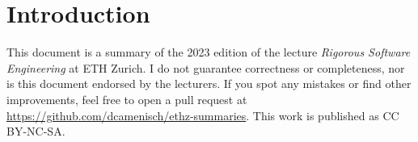 \section{Introduction}

This document is a summary of the 2023 edition of the lecture \textit{Rigorous Software Engineering} at ETH Zurich. I do not guarantee correctness or completeness, nor is this document endorsed by the lecturers. If you spot any mistakes or find other improvements, feel free to open a pull request at \url{https://github.com/dcamenisch/ethz-summaries}. This work is published as CC BY-NC-SA.
\begin{center}
	\ccbyncsa
\end{center}